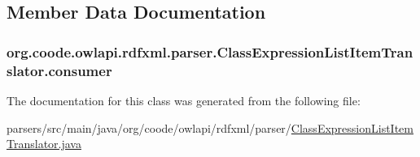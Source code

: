 \subsection{Member Data Documentation}
\hypertarget{classorg_1_1coode_1_1owlapi_1_1rdfxml_1_1parser_1_1_class_expression_list_item_translator_add0c11b41dbb6f2c08059fef24b77c8a}{
\subsubsection[{consumer}]{ org.\-coode.\-owlapi.\-rdfxml.\-parser.\-Class\-Expression\-List\-Item\-Translator.\-consumer\hspace{0.3cm}{\ttfamily [private]}}}\label{classorg_1_1coode_1_1owlapi_1_1rdfxml_1_1parser_1_1_class_expression_list_item_translator_add0c11b41dbb6f2c08059fef24b77c8a}


The documentation for this class was generated from the following file\-:\begin{DoxyCompactItemize}
\item 
parsers/src/main/java/org/coode/owlapi/rdfxml/parser/\hyperlink{_class_expression_list_item_translator_8java}{Class\-Expression\-List\-Item\-Translator.\-java}\end{DoxyCompactItemize}
